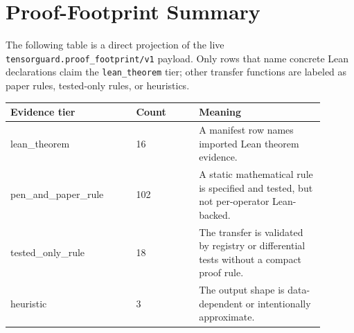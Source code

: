 \documentclass[10pt]{article}
\begin{document}
\section{Proof-Footprint Summary}
The following table is a direct projection of the live \texttt{tensorguard.proof\_footprint/v1} payload. Only rows that name concrete Lean declarations claim the \texttt{lean\_theorem} tier; other transfer functions are labeled as paper rules, tested-only rules, or heuristics.
\begin{longtable}{|p{0.36\linewidth}|p{0.18\linewidth}|p{0.36\linewidth}|}
\hline
\textbf{Evidence tier} & \textbf{Count} & \textbf{Meaning} \\
\hline
lean\_theorem & 16 & A manifest row names imported Lean theorem evidence. \\
\hline
pen\_and\_paper\_rule & 102 & A static mathematical rule is specified and tested, but not per-operator Lean-backed. \\
\hline
tested\_only\_rule & 18 & The transfer is validated by registry or differential tests without a compact proof rule. \\
\hline
heuristic & 3 & The output shape is data-dependent or intentionally approximate. \\
\hline
\end{longtable}
\end{document}
